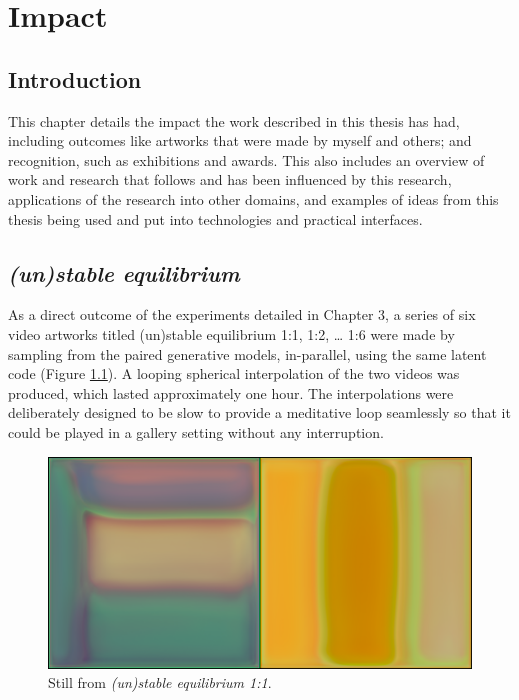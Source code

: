 \chapter{Impact}
\label{ch:impact}

\section{Introduction}

This chapter details the impact the work described in this thesis has had, including outcomes like artworks that were made by myself and others; and recognition, such as exhibitions and awards. 
This also includes an overview of work and research that follows and has been influenced by this research, applications of the research into other domains, and examples of ideas from this thesis being used and put into technologies and practical interfaces. 

\section{\textit{(un)stable equilibrium}}
\label{c7:sec:unstable_eq}

As a direct outcome of the experiments detailed in Chapter 3, a series of six video artworks titled (un)stable equilibrium 1:1, 1:2, … 1:6 were made by sampling from the paired generative models, in-parallel, using the same latent code (Figure \ref{fig:c7:ue_still}). 
A looping spherical interpolation \citep{white2016sampling} of the two videos was produced, which lasted approximately one hour. 
The interpolations were deliberately designed to be slow to provide a meditative loop seamlessly so that it could be played in a gallery setting without any interruption.

\begin{figure}[!htb]
    \centering
    \captionsetup{justification=centering}
    \includegraphics[width=1\textwidth]{figures/c7_impact/ue_1_1_still.png}
    \caption{Still from \textit{(un)stable equilibrium 1:1}.}
    \label{fig:c7:ue_still}
\end{figure}

